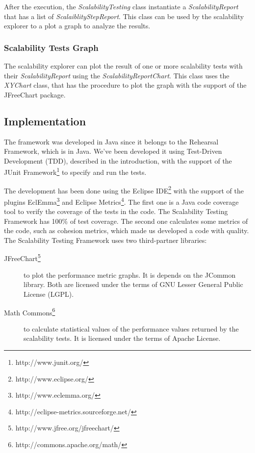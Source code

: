 After the execution, the \emph{ScalabilityTesting} class instantiate a \emph{ScalabilityReport} that has a list of \emph{ScalaiblityStepReport}. This class can be used by the scalability explorer to a plot a graph to analyze the results.

\subsubsection{Scalability Tests Graph}
The scalability explorer can plot the result of one or more scalability tests with their \emph{ScalabilityReport} using the \emph{ScalabilityReportChart}. This class uses the \emph{XYChart} class, that has the procedure to plot the graph with the support of the JFreeChart package.


\subsection{Implementation}

The framework was developed in Java since it belongs to the Rehearsal Framework, which is in Java. We've been developed it using Test-Driven Development (TDD), described in the introduction, with the support of the JUnit Framework\footnote{http://www.junit.org/} to specify and run the tests.

The development has been done using the Eclipse IDE\footnote{http://www.eclipse.org/} with the support of the plugins EclEmma\footnote{http://www.eclemma.org/} and Eclipse Metrics\footnote{http://eclipse-metrics.sourceforge.net/}. The first one is a Java code coverage tool to verify the coverage of the tests in the code. The Scalability Testing Framework has 100\% of test coverage. The second one calculates some metrics of the code, such as cohesion metrics, which made us developed a code with quality.\\

The Scalability Testing Framework uses two third-partner libraries:
\begin{description}
\item[JFreeChart\footnote{http://www.jfree.org/jfreechart/}] to plot the performance metric graphs. It is depends on the JCommon library. Both are licensed under the terms of GNU Lesser General Public License (LGPL). 
\item[Math Commons\footnote{http://commons.apache.org/math/}] to calculate statistical values of the performance values returned by the scalability tests. It is licensed under the terms of Apache License.
\end{description}

